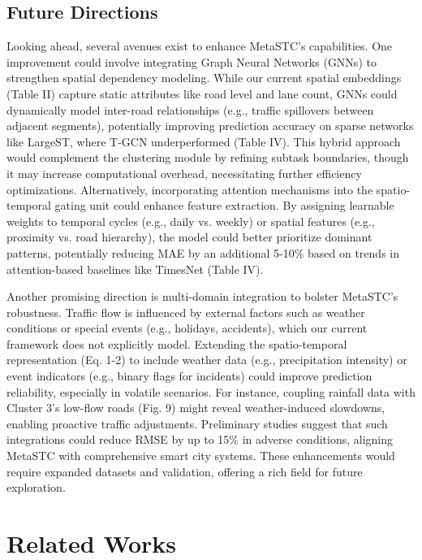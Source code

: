 \documentclass[lettersize,journal]{IEEEtran}
\begin{document}
\subsection{Future Directions}
Looking ahead, several avenues exist to enhance MetaSTC’s capabilities. One improvement could involve integrating Graph Neural Networks (GNNs) to strengthen spatial dependency modeling. While our current spatial embeddings (Table II) capture static attributes like road level and lane count, GNNs could dynamically model inter-road relationships (e.g., traffic spillovers between adjacent segments), potentially improving prediction accuracy on sparse networks like LargeST, where T-GCN underperformed (Table IV). This hybrid approach would complement the clustering module by refining subtask boundaries, though it may increase computational overhead, necessitating further efficiency optimizations. Alternatively, incorporating attention mechanisms into the spatio-temporal gating unit could enhance feature extraction. By assigning learnable weights to temporal cycles (e.g., daily vs. weekly) or spatial features (e.g., proximity vs. road hierarchy), the model could better prioritize dominant patterns, potentially reducing MAE by an additional 5-10\% based on trends in attention-based baselines like TimesNet (Table IV).

Another promising direction is multi-domain integration to bolster MetaSTC’s robustness. Traffic flow is influenced by external factors such as weather conditions or special events (e.g., holidays, accidents), which our current framework does not explicitly model. Extending the spatio-temporal representation (Eq. 1-2) to include weather data (e.g., precipitation intensity) or event indicators (e.g., binary flags for incidents) could improve prediction reliability, especially in volatile scenarios. For instance, coupling rainfall data with Cluster 3’s low-flow roads (Fig. 9) might reveal weather-induced slowdowns, enabling proactive traffic adjustments. Preliminary studies suggest that such integrations could reduce RMSE by up to 15\% in adverse conditions, aligning MetaSTC with comprehensive smart city systems. These enhancements would require expanded datasets and validation, offering a rich field for future exploration.

\color{black}

\section{Related Works}
\end{document}
